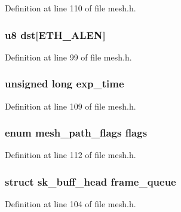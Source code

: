 Definition at line 110 of file mesh.\-h.

\hypertarget{structmesh__path_a7e206c9dbce55c0147656b4e271c71e4}{
\subsubsection[{dst}]{\setlength{\rightskip}{0pt plus 5cm}u8 dst\mbox{[}E\-T\-H\-\_\-\-A\-L\-E\-N\mbox{]}}}\label{structmesh__path_a7e206c9dbce55c0147656b4e271c71e4}


Definition at line 99 of file mesh.\-h.

\hypertarget{structmesh__path_af01b3e5a14761c34e4298e254fb7c094}{
\subsubsection[{exp\-\_\-time}]{\setlength{\rightskip}{0pt plus 5cm}unsigned long exp\-\_\-time}}\label{structmesh__path_af01b3e5a14761c34e4298e254fb7c094}


Definition at line 109 of file mesh.\-h.

\hypertarget{structmesh__path_acdca1d9efeb99cd79e04eaaf7b94f159}{
\subsubsection[{flags}]{\setlength{\rightskip}{0pt plus 5cm}enum {\bf mesh\-\_\-path\-\_\-flags} flags}}\label{structmesh__path_acdca1d9efeb99cd79e04eaaf7b94f159}


Definition at line 112 of file mesh.\-h.

\hypertarget{structmesh__path_a78a751fa8f8fb1623ed2b86bd59017db}{
\subsubsection[{frame\-\_\-queue}]{\setlength{\rightskip}{0pt plus 5cm}struct sk\-\_\-buff\-\_\-head frame\-\_\-queue}}\label{structmesh__path_a78a751fa8f8fb1623ed2b86bd59017db}


Definition at line 104 of file mesh.\-h.

